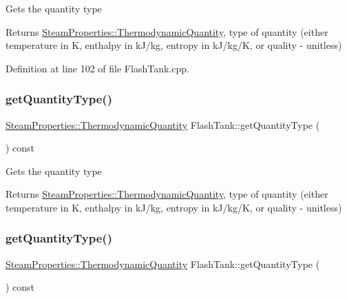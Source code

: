 Gets the quantity type \begin{DoxyReturn}{Returns}
\hyperlink{class_steam_properties_ae0294bedf7d178c2d8fb6aed0f62fbff}{Steam\+Properties\+::\+Thermodynamic\+Quantity}, type of quantity (either temperature in K, enthalpy in k\+J/kg, entropy in k\+J/kg/K, or quality -\/ unitless) 
\end{DoxyReturn}


Definition at line 102 of file Flash\+Tank.\+cpp.

\mbox{\label{class_flash_tank_a1800317a9b9dd8ff8fb18c693e846a45}} 
\subsubsection{\texorpdfstring{get\+Quantity\+Type()}{getQuantityType()}\hspace{0.1cm}{\footnotesize\ttfamily [2/3]}}
{\footnotesize\ttfamily \hyperlink{class_steam_properties_ae0294bedf7d178c2d8fb6aed0f62fbff}{Steam\+Properties\+::\+Thermodynamic\+Quantity} Flash\+Tank\+::get\+Quantity\+Type (\begin{DoxyParamCaption}{ }\end{DoxyParamCaption}) const}

Gets the quantity type \begin{DoxyReturn}{Returns}
\hyperlink{class_steam_properties_ae0294bedf7d178c2d8fb6aed0f62fbff}{Steam\+Properties\+::\+Thermodynamic\+Quantity}, type of quantity (either temperature in K, enthalpy in k\+J/kg, entropy in k\+J/kg/K, or quality -\/ unitless) 
\end{DoxyReturn}
\mbox{\label{class_flash_tank_a1800317a9b9dd8ff8fb18c693e846a45}} 
\subsubsection{\texorpdfstring{get\+Quantity\+Type()}{getQuantityType()}\hspace{0.1cm}{\footnotesize\ttfamily [3/3]}}
{\footnotesize\ttfamily \hyperlink{class_steam_properties_ae0294bedf7d178c2d8fb6aed0f62fbff}{Steam\+Properties\+::\+Thermodynamic\+Quantity} Flash\+Tank\+::get\+Quantity\+Type (\begin{DoxyParamCaption}{ }\end{DoxyParamCaption}) const}

